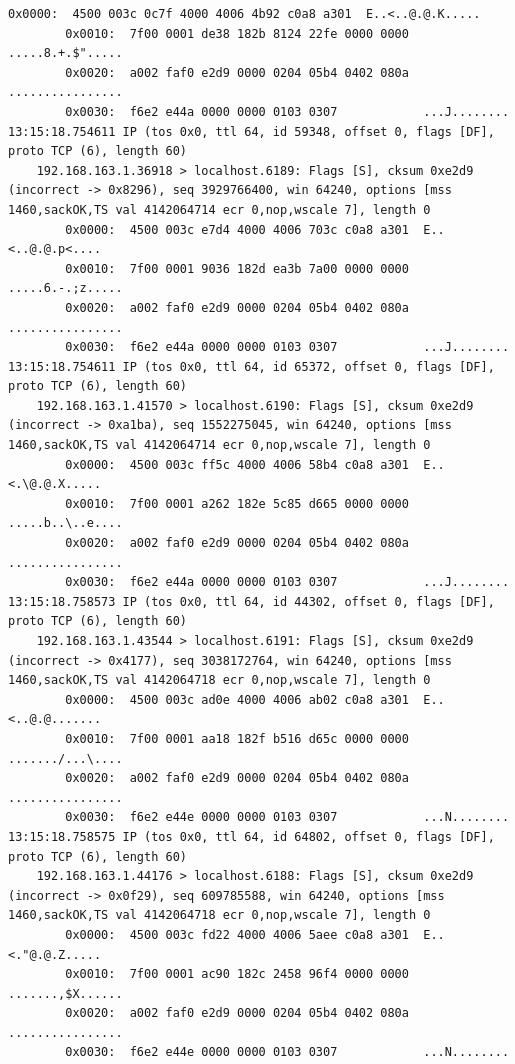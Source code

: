 \documentclass[11pt, a4paper]{article}
\begin{document}
\begin{Verbatim}[fontsize=\footnotesize]
        0x0000:  4500 003c 0c7f 4000 4006 4b92 c0a8 a301  E..<..@.@.K.....
        0x0010:  7f00 0001 de38 182b 8124 22fe 0000 0000  .....8.+.$".....
        0x0020:  a002 faf0 e2d9 0000 0204 05b4 0402 080a  ................
        0x0030:  f6e2 e44a 0000 0000 0103 0307            ...J........
13:15:18.754611 IP (tos 0x0, ttl 64, id 59348, offset 0, flags [DF], proto TCP (6), length 60)
    192.168.163.1.36918 > localhost.6189: Flags [S], cksum 0xe2d9 (incorrect -> 0x8296), seq 3929766400, win 64240, options [mss 1460,sackOK,TS val 4142064714 ecr 0,nop,wscale 7], length 0
        0x0000:  4500 003c e7d4 4000 4006 703c c0a8 a301  E..<..@.@.p<....
        0x0010:  7f00 0001 9036 182d ea3b 7a00 0000 0000  .....6.-.;z.....
        0x0020:  a002 faf0 e2d9 0000 0204 05b4 0402 080a  ................
        0x0030:  f6e2 e44a 0000 0000 0103 0307            ...J........
13:15:18.754611 IP (tos 0x0, ttl 64, id 65372, offset 0, flags [DF], proto TCP (6), length 60)
    192.168.163.1.41570 > localhost.6190: Flags [S], cksum 0xe2d9 (incorrect -> 0xa1ba), seq 1552275045, win 64240, options [mss 1460,sackOK,TS val 4142064714 ecr 0,nop,wscale 7], length 0
        0x0000:  4500 003c ff5c 4000 4006 58b4 c0a8 a301  E..<.\@.@.X.....
        0x0010:  7f00 0001 a262 182e 5c85 d665 0000 0000  .....b..\..e....
        0x0020:  a002 faf0 e2d9 0000 0204 05b4 0402 080a  ................
        0x0030:  f6e2 e44a 0000 0000 0103 0307            ...J........
13:15:18.758573 IP (tos 0x0, ttl 64, id 44302, offset 0, flags [DF], proto TCP (6), length 60)
    192.168.163.1.43544 > localhost.6191: Flags [S], cksum 0xe2d9 (incorrect -> 0x4177), seq 3038172764, win 64240, options [mss 1460,sackOK,TS val 4142064718 ecr 0,nop,wscale 7], length 0
        0x0000:  4500 003c ad0e 4000 4006 ab02 c0a8 a301  E..<..@.@.......
        0x0010:  7f00 0001 aa18 182f b516 d65c 0000 0000  ......./...\....
        0x0020:  a002 faf0 e2d9 0000 0204 05b4 0402 080a  ................
        0x0030:  f6e2 e44e 0000 0000 0103 0307            ...N........
13:15:18.758575 IP (tos 0x0, ttl 64, id 64802, offset 0, flags [DF], proto TCP (6), length 60)
    192.168.163.1.44176 > localhost.6188: Flags [S], cksum 0xe2d9 (incorrect -> 0x0f29), seq 609785588, win 64240, options [mss 1460,sackOK,TS val 4142064718 ecr 0,nop,wscale 7], length 0
        0x0000:  4500 003c fd22 4000 4006 5aee c0a8 a301  E..<."@.@.Z.....
        0x0010:  7f00 0001 ac90 182c 2458 96f4 0000 0000  .......,$X......
        0x0020:  a002 faf0 e2d9 0000 0204 05b4 0402 080a  ................
        0x0030:  f6e2 e44e 0000 0000 0103 0307            ...N........

\end{Verbatim}
\end{document}

